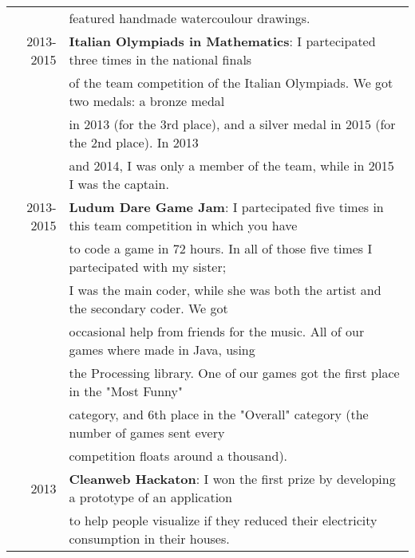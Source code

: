 \documentclass[a4paper,10pt]{article} %
\begin{document}
\begin{tabular}{rl}
     & featured handmade watercoulour drawings.\\
2013-2015 & \textbf{Italian Olympiads in Mathematics}: I partecipated three times in the national finals\\
     & of the team competition of the Italian Olympiads. We got two medals: a bronze medal \\
     & in 2013 (for the 3rd place), and a silver medal in 2015 (for the 2nd place). In 2013\\
     & and 2014, I was only a member of the team, while in 2015 I was the captain.\\
2013-2015 & \textbf{Ludum Dare Game Jam}: I partecipated five times in this team competition in which you have\\
     & to code a game in 72 hours. In all of those five times I partecipated with my sister;\\
     & I was the main coder, while she was both the artist and the secondary coder. We got \\
     & occasional help from friends for the music. All of our games where made in Java, using \\
     & the Processing library. One of our games got the first place in the "Most Funny" \\
     & category, and 6th place in the "Overall" category (the number of games sent every \\
     & competition floats around a thousand).\\
2013 & \textbf{Cleanweb Hackaton}: I won the first prize by developing a prototype of an application\\
     & to help people visualize if they reduced their electricity consumption in their houses.\\
\end{tabular}



\end{document}
